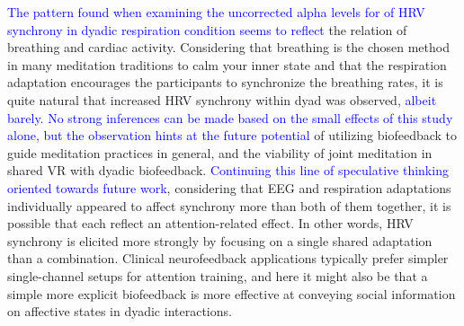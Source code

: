 \documentclass[manuscript, review = false, screen]{acmart}
\begin{document}
\textcolor{blue}{The pattern found when examining the uncorrected alpha levels for of HRV synchrony in dyadic respiration condition seems to reflect} the relation of breathing and cardiac activity. Considering that breathing is the chosen method in many meditation traditions to calm your inner state and that the respiration adaptation encourages the participants to synchronize the breathing rates, it is quite natural that increased HRV synchrony within dyad was observed, \textcolor{blue}{albeit barely. No strong inferences can be made based on the small effects of this study alone, but the observation hints at the future potential} of utilizing biofeedback to guide meditation practices in general, and the viability of joint meditation in shared VR with dyadic biofeedback. \textcolor{blue}{Continuing this line of speculative thinking oriented towards future work}, considering that EEG and respiration adaptations individually appeared to affect synchrony more than both of them together, it is possible that each reflect an attention-related effect. In other words, HRV synchrony is elicited more strongly by focusing on a single shared adaptation than a combination. Clinical neurofeedback applications typically prefer simpler single-channel setups for attention training, and here it might also be that a simple more explicit biofeedback is more effective at conveying social information on affective states in dyadic interactions.
\end{document}
